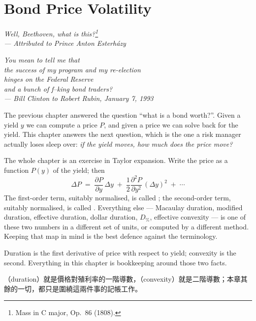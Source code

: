 \chapter{Bond Price Volatility}


\begin{flushright}
	\itshape Well, Beethoven, what is this?\footnote{Mass in C major, Op.~86 (1808).}\\
	\upshape --- Attributed to Prince Anton Esterházy

	\medskip

	\itshape You mean to tell me that\\
	the success of my program and my re-election\\
	hinges on the Federal Reserve\\
	and a bunch of f--king bond traders?\\
	\upshape --- Bill Clinton to Robert Rubin, January 7, 1993
\end{flushright}

\bigskip

\suppstart
\noindent The previous chapter answered the question ``what is a bond worth?''.
Given a yield $y$ we can compute a price $P$, and given a price we can solve back for the yield.
This chapter answers the next question, which is the one a risk manager actually loses sleep over: \emph{if the yield moves, how much does the price move?}

The whole chapter is an exercise in Taylor expansion.
Write the price as a function $P(y)$ of the yield; then
\[
	\Delta P \;=\; \frac{\partial P}{\partial y}\,\Delta y
	\;+\; \frac{1}{2}\frac{\partial^{2}P}{\partial y^{2}}\,(\Delta y)^{2}
	\;+\; \cdots
\]
The first-order term, suitably normalised, is called ; the second-order term, suitably normalised, is called .
Everything else --- Macaulay duration, modified duration, effective duration, dollar duration, $D_{\%}$, effective convexity --- is one of these two numbers in a different set of units, or computed by a different method.
Keeping that map in mind is the best defence against the terminology.

\begin{moral}
	Duration is the first derivative of price with respect to yield; convexity is the second.
	Everything in this chapter is bookkeeping around those two facts.

	（duration）就是價格對殖利率的一階導數，（convexity）就是二階導數；本章其餘的一切，都只是圍繞這兩件事的記帳工作。
\end{moral}
\suppend

